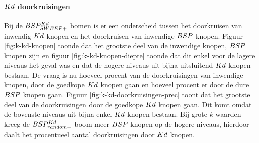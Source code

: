 \paragraph{$Kd$ doorkruisingen}
Bij de $BSP^{Kd}_{SWEEP+}$ bomen is er een onderscheid tussen het doorkruisen van inwendig $Kd$ knopen en het doorkruisen van inwendige $BSP$ knopen. Figuur \ref{fig:k-kd-knopen} toonde dat het grootste deel van de inwendige knopen, $BSP$ knopen zijn en figuur \ref{fig:k-kd-knopen-diepte} toonde dat dit enkel voor de lagere niveaus het geval was en dat de hogere niveaus uit bijna uitsluitend $Kd$ knopen bestaan. De vraag is nu hoeveel procent van de doorkruisingen van inwendige knopen, door de goedkope $Kd$ knopen gaan en hoeveel procent er door de dure $BSP$ knopen gaan. Figuur \ref{fig:k-kd-doorkruisingen-prec} toont dat het grootste deel van de doorkruisingen door de goedkope $Kd$ knopen gaan. Dit komt omdat de bovenste niveaus uit bijna enkel $Kd$ knopen bestaan. Bij grote $k$-waarden kreeg de $BSP^{Kd}_{random+}$ boom meer $BSP$ knopen op de hogere niveaus, hierdoor daalt het procentueel aantal doorkruisingen door $Kd$ knopen.

